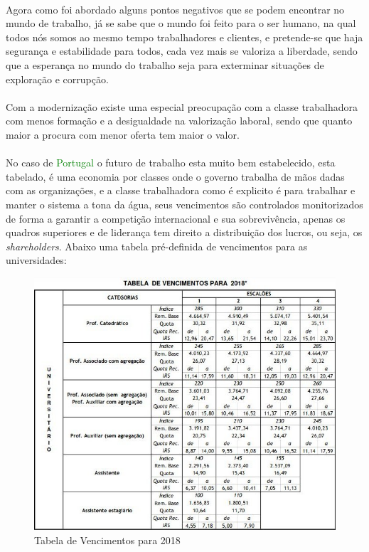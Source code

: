 \\
Agora como foi abordado alguns pontos negativos que se podem encontrar no mundo de trabalho, já se sabe que o mundo foi feito para o ser humano, na qual todos nós somos ao mesmo tempo trabalhadores e clientes, e pretende-se que haja segurança e estabilidade para todos, cada vez mais se valoriza a liberdade, sendo que a esperança no mundo do trabalho seja para exterminar situações de exploração e corrupção.\\
\\
Com a modernização existe uma especial preocupação com a classe trabalhadora com menos formação e a desigualdade na valorização laboral, sendo que quanto maior a procura com menor oferta tem maior o valor.\\
\\
No caso de \textcolor{green}{Portugal} o futuro de trabalho esta muito bem estabelecido, esta tabelado, é uma economia por classes onde o governo trabalha de mãos dadas com as organizações, e a classe trabalhadora como é explicito é para trabalhar e manter o sistema a tona da água, seus vencimentos são controlados monitorizados de forma a garantir a competição internacional e sua sobrevivência, apenas os quadros superiores e de liderança tem direito a distribuição dos lucros, ou seja, os \textit{shareholders}.
\newpage
Abaixo uma tabela pré-definida de vencimentos para as universidades:\\
\begin{figure}[H]
	\centering
	\includegraphics[scale=0.52]{./image/Salary/Universidade.jpg}
	\caption{Tabela de Vencimentos para 2018 \cite{article-2}}
\end{figure}
